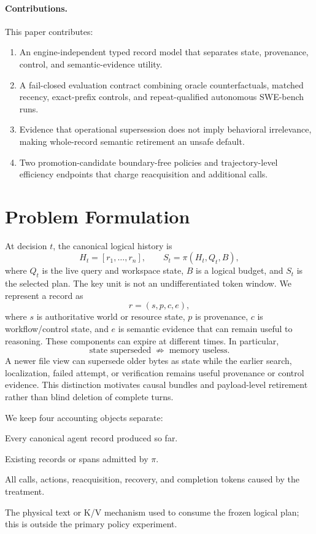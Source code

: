 \documentclass[11pt]{article}
\begin{document}
\paragraph{Contributions.}
This paper contributes:
\begin{enumerate}[leftmargin=*]
    \item An engine-independent typed record model that separates state,
    provenance, control, and semantic-evidence utility.
    \item A fail-closed evaluation contract combining oracle counterfactuals,
    matched recency, exact-prefix controls, and repeat-qualified autonomous
    SWE-bench runs.
    \item Evidence that operational supersession does not imply behavioral
    irrelevance, making whole-record semantic retirement an unsafe default.
    \item Two promotion-candidate boundary-free policies and trajectory-level
    efficiency endpoints that charge reacquisition and additional calls.
\end{enumerate}

\section{Problem Formulation}

At decision $t$, the canonical logical history is
\[
H_t=[r_1,\ldots,r_n], \qquad S_t=\pi(H_t,Q_t,B),
\]
where $Q_t$ is the live query and workspace state, $B$ is a logical budget,
and $S_t$ is the selected plan.  The key unit is not an undifferentiated token
window.  We represent a record as
\[
r=(s,p,c,e),
\]
where $s$ is authoritative world or resource state, $p$ is provenance, $c$ is
workflow/control state, and $e$ is semantic evidence that can remain useful to
reasoning.  These components can expire at different times.  In particular,
\[
\boxed{\text{state superseded}\;\not\Rightarrow\;\text{memory useless}.}
\]
A newer file view can supersede older bytes as state while the earlier search,
localization, failed attempt, or verification remains useful provenance or
control evidence.  This distinction motivates causal bundles and payload-level
retirement rather than blind deletion of complete turns.

We keep four accounting objects separate:
\begin{description}[leftmargin=!,labelwidth=3.4cm]
\item[Logical history.] Every canonical agent record produced so far.
\item[Selected history.] Existing records or spans admitted by $\pi$.
\item[Realized trajectory.] All calls, actions, reacquisition, recovery, and
completion tokens caused by the treatment.
\item[Engine realization.] The physical text or K/V mechanism used to consume
the frozen logical plan; this is outside the primary policy experiment.
\end{description}
\end{document}
